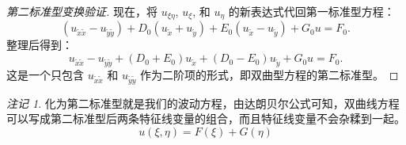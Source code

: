 \documentclass[a4paper, 12pt, oneside]{article} %
\numberwithin{subsection}{section}
\numberwithin{subsubsection}{subsection}
\theoremstyle{plain}
\theoremstyle{definition}
\theoremstyle{remark}
\newtheorem{remark}[theorem]{注记}
\begin{document}
\begin{proof}[第二标准型变换验证]
			现在，将 \(u_{\xi\eta}\), \(u_\xi\), 和 \(u_\eta\) 的新表达式代回第一标准型方程：
			\[
			(u_{\tilde{x}\tilde{x}} - u_{\tilde{y}\tilde{y}}) + D_0(u_{\tilde{x}} + u_{\tilde{y}}) + E_0(u_{\tilde{x}} - u_{\tilde{y}}) + G_0 u = F_0.
			\]
			整理后得到：
			\[
			u_{\tilde{x}\tilde{x}} - u_{\tilde{y}\tilde{y}} + (D_0+E_0)u_{\tilde{x}} + (D_0-E_0)u_{\tilde{y}} + G_0 u = F_0.
			\]
			这是一个只包含 \(u_{\tilde{x}\tilde{x}}\) 和 \(u_{\tilde{y}\tilde{y}}\) 作为二阶项的形式，即双曲型方程的第二标准型。
		\end{proof}
		\begin{remark}
			化为第二标准型就是我们的波动方程，由达朗贝尔公式可知，双曲线方程可以写成第二标准型后两条特征线变量的组合，而且特征线变量不会杂糅到一起。
			\[
			u(\xi, \eta) = F(\xi) + G(\eta)
			\]
		\end{remark}
		
\end{document}
